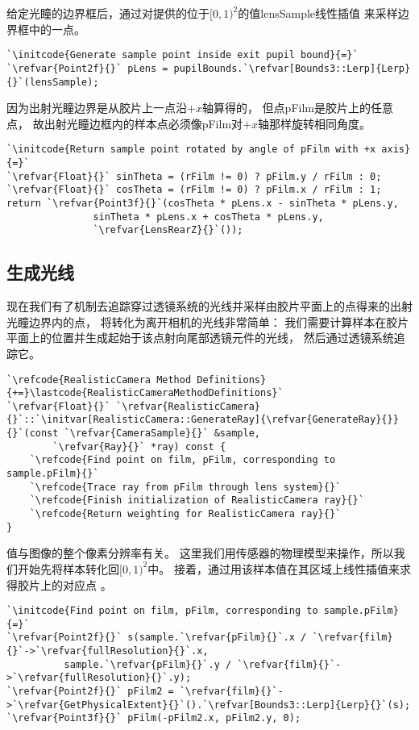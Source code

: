 给定光瞳的边界框后，通过对提供的位于$[0,1)^2$的值{\ttfamily lensSample}线性插值
来采样边界框中的一点。
\begin{lstlisting}
`\initcode{Generate sample point inside exit pupil bound}{=}`
`\refvar{Point2f}{}` pLens = pupilBounds.`\refvar[Bounds3::Lerp]{Lerp}{}`(lensSample);
\end{lstlisting}

因为出射光瞳边界是从胶片上一点沿$+x$轴算得的，
但点{\ttfamily pFilm}是胶片上的任意点，
故出射光瞳边框内的样本点必须像{\ttfamily pFilm}对$+x$轴那样旋转相同角度。
\begin{lstlisting}
`\initcode{Return sample point rotated by angle of pFilm with +x axis}{=}`
`\refvar{Float}{}` sinTheta = (rFilm != 0) ? pFilm.y / rFilm : 0;
`\refvar{Float}{}` cosTheta = (rFilm != 0) ? pFilm.x / rFilm : 1;
return `\refvar{Point3f}{}`(cosTheta * pLens.x - sinTheta * pLens.y,
               sinTheta * pLens.x + cosTheta * pLens.y,
               `\refvar{LensRearZ}{}`());
\end{lstlisting}

\subsection{生成光线}\label{sub:生成光线}
现在我们有了机制去追踪穿过透镜系统的光线并采样由胶片平面上的点得来的出射光瞳边界内的点，
将转化为离开相机的光线非常简单：
我们需要计算样本在胶片平面上的位置并生成起始于该点射向尾部透镜元件的光线，
然后通过透镜系统追踪它。
\begin{lstlisting}
`\refcode{RealisticCamera Method Definitions}{+=}\lastcode{RealisticCameraMethodDefinitions}`
`\refvar{Float}{}` `\refvar{RealisticCamera}{}`::`\initvar[RealisticCamera::GenerateRay]{\refvar{GenerateRay}{}}{}`(const `\refvar{CameraSample}{}` &sample,
        `\refvar{Ray}{}` *ray) const {
    `\refcode{Find point on film, pFilm, corresponding to sample.pFilm}{}`
    `\refcode{Trace ray from pFilm through lens system}{}`
    `\refcode{Finish initialization of RealisticCamera ray}{}`
    `\refcode{Return weighting for RealisticCamera ray}{}`
}
\end{lstlisting}

值与图像的整个像素分辨率有关。
这里我们用传感器的物理模型来操作，所以我们开始先将样本转化回$[0,1)^2$中。
接着，通过用该样本值在其区域上线性插值来求得胶片上的对应点
。
\begin{lstlisting}
`\initcode{Find point on film, pFilm, corresponding to sample.pFilm}{=}`
`\refvar{Point2f}{}` s(sample.`\refvar{pFilm}{}`.x / `\refvar{film}{}`->`\refvar{fullResolution}{}`.x,
          sample.`\refvar{pFilm}{}`.y / `\refvar{film}{}`->`\refvar{fullResolution}{}`.y);
`\refvar{Point2f}{}` pFilm2 = `\refvar{film}{}`->`\refvar{GetPhysicalExtent}{}`().`\refvar[Bounds3::Lerp]{Lerp}{}`(s);
`\refvar{Point3f}{}` pFilm(-pFilm2.x, pFilm2.y, 0);
\end{lstlisting}

